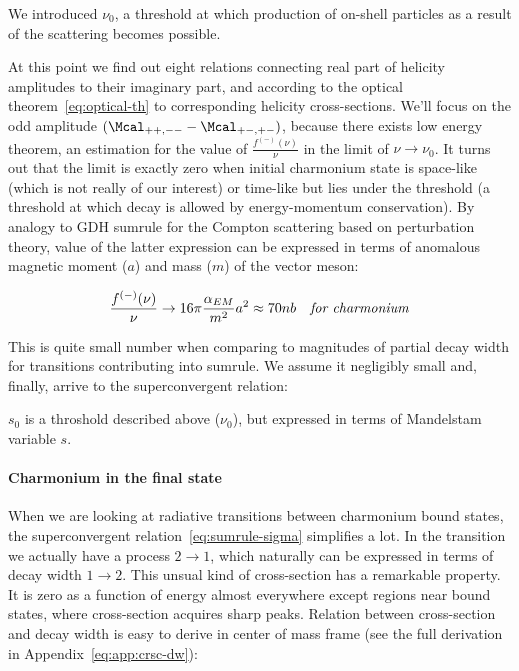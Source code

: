 We introduced $\nu_0$, a threshold at which production of on-shell particles as a result of the scattering becomes possible.

At this point we find out eight relations connecting real part of helicity amplitudes to their imaginary part, and according to the optical theorem~\cref{eq:optical-th} to corresponding helicity cross-sections. We'll focus on the odd amplitude $(\Mcal_{++,--} - \Mcal_{+-,+-})$, because there exists low energy theorem, an estimation for the value of $\frac{f^{(-)}(\nu)}{\nu}$ in the limit of $\nu \rightarrow \nu_0$. It turns out that the limit is exactly zero when initial charmonium state is space-like (which is not really of our interest) or time-like but lies under the threshold (a threshold at which decay is allowed by energy-momentum conservation). By analogy to GDH sumrule for the Compton scattering based on perturbation theory, value of the latter expression can be expressed in terms of anomalous magnetic moment ($a$) and mass ($m$) of the vector meson:

\begin{align}
    \frac{f^{(-)}(\nu)}{\nu} \rightarrow 16 \pi \frac{\alpha_{EM}}{m^2} a^2 \approx 70 nb \text{\quad \textit{for charmonium}}
\end{align}

This is quite small number when comparing to magnitudes of partial decay width for transitions contributing into sumrule. We assume it negligibly small and, finally, arrive to the superconvergent relation:

\begin{center}  \end{center}

$s_0$ is a throshold described above ($\nu_0$), but expressed in terms of Mandelstam variable $s$.

\paragraph{Charmonium in the final state}
When we are looking at radiative transitions between charmonium bound states, the superconvergent relation~\cref{eq:sumrule-sigma} simplifies a lot. In the transition we actually have a process $2 \rightarrow 1$, which naturally can be expressed in terms of decay width $1 \rightarrow 2$. This unsual kind of cross-section has a remarkable property. It is zero as a function of energy almost everywhere except regions near bound states, where cross-section acquires sharp peaks. Relation between cross-section and decay width is easy to derive in center of mass frame (see the full derivation in Appendix~\cref{eq:app:crsc-dw}):

